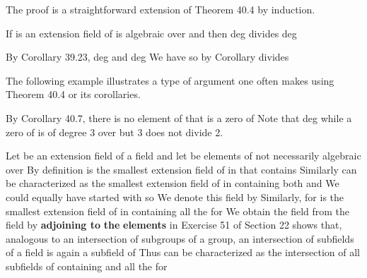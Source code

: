 \documentclass[11pt,oneside]{article}
\begin{document}
\begin{BookBody}
 The proof is a straightforward extension of Theorem 40.4 by induction. \BookEnd{\blacklozenge}

 If  is an extension field of  is algebraic over  and  then deg divides deg

 By Corollary 39.23, deg and deg We have   so by Corollary  divides \BookEnd{\blacklozenge}

The following example illustrates a type of argument one often makes using Theorem 40.4 or its corollaries.

 By Corollary 40.7, there is no element of  that is a zero of  Note that deg while a zero of  is of degree 3 over  but 3 does not divide 2. \BookEnd{\blacktriangle}

Let  be an extension field of a field  and let  be elements of  not necessarily algebraic over  By definition is the smallest extension field of  in  that contains  Similarly can be characterized as the smallest extension field of  in  containing both  and  We could equally have started with  so  We denote this field by  Similarly, for  is the smallest extension field of  in  containing all the  for  We obtain the field  from the field  by\textbf{ adjoining to}  \textbf{the} \textbf{elements}  in  Exercise 51 of Section 22 shows that, analogous to an intersection of subgroups of a group, an intersection of subfields of a field  is again a subfield of  Thus  can be characterized as the intersection of all subfields of  containing  and all the  for 


\end{BookBody}
\end{document}
